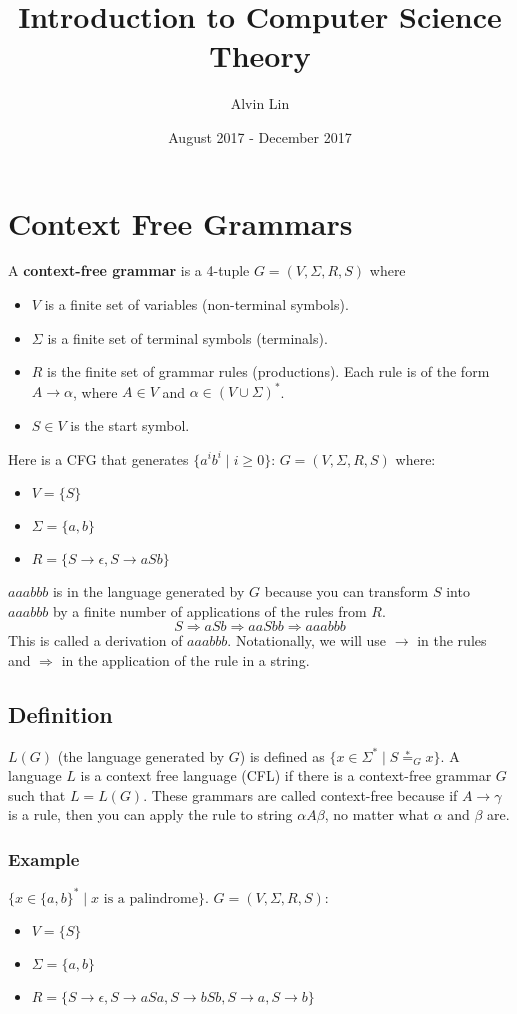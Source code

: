 \documentclass{math}
\title{Introduction to Computer Science Theory}
\author{Alvin Lin}
\date{August 2017 - December 2017}
\begin{document}
\maketitle

\section*{Context Free Grammars}
A \textbf{context-free grammar} is a 4-tuple \( G = (V,\Sigma,R,S) \) where
\begin{itemize}
  \item \( V \) is a finite set of variables (non-terminal symbols).
  \item \( \Sigma \) is a finite set of terminal symbols (terminals).
  \item \( R \) is the finite set of grammar rules (productions). Each rule is
  of the form \( A\to\alpha \), where \( A\in V \) and
  \( \alpha\in(V\cup\Sigma)^* \).
  \item \( S\in V \) is the start symbol.
\end{itemize}
Here is a CFG that generates \( \{a^ib^i\mid i\ge0\} \):
\( G = (V,\Sigma,R,S) \) where:
\begin{itemize}
  \item \( V = \{S\} \)
  \item \( \Sigma = \{a,b\} \)
  \item \( R = \{S\to\epsilon,S\to aSb\} \)
\end{itemize}
\( aaabbb \) is in the language generated by \( G \) because you can transform
\( S \) into \( aaabbb \) by a finite number of applications of the rules from
\( R \).
\[ S\Rightarrow aSb\Rightarrow aaSbb\Rightarrow aaabbb \]
This is called a derivation of \( aaabbb \). Notationally, we will use \( \to \)
in the rules and \( \Rightarrow \) in the application of the rule in a string.

\subsection*{Definition}
\( L(G) \) (the language generated by \( G \)) is defined as \( \{x\in\Sigma^*
\mid S\stackrel{*}{=}_{G}x\} \). A language \( L \) is a context free language
(CFL) if there is a context-free grammar \( G \) such that \( L = L(G) \).
These grammars are called context-free because if \( A\to\gamma \) is a rule,
then you can apply the rule to string \( \alpha A\beta \), no matter what
\( \alpha \) and \( \beta \) are.

\subsubsection*{Example}
\( \{x\in\{a,b\}^*\mid x\text{ is a palindrome}\} \). \( G = (V,\Sigma,R,S) \):
\begin{itemize}
  \item \( V = \{S\} \)
  \item \( \Sigma = \{a,b\} \)
  \item \( R = \{ S\to\epsilon, S\to aSa, S\to bSb, S\to a, S\to b\} \)
\end{itemize}
\end{document}
